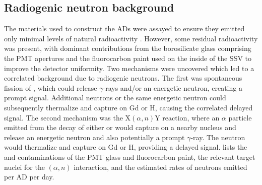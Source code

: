 \subsection{Radiogenic neutron background}
\label{subsec:radn}

The materials used to construct the ADs were
assayed to ensure they emitted only minimal levels of natural radioactivity
\cite{sidebyside}.
However, some residual radioactivity was present,
with dominant contributions from the borosilicate glass comprising the PMT apertures
and the fluorocarbon paint \cite{fluorocarbon_paint} used on the inside of the SSV
to improve the detector uniformity.
Two mechanisms were uncovered which led to a correlated background
due to radiogenic neutrons\cite{rad_n_intro}.
The first was spontaneous fission of ,
which could release $\gamma$-rays and/or an energetic neutron,
creating a prompt signal.
Additional neutrons or the same energetic neutron
could subsequently thermalize and capture on Gd or H,
causing the correlated delayed signal.
The second mechanism was the $\text{X}(\alpha, n)\text{Y}$ reaction,
where an $\alpha$ particle emitted from the decay of
either  or 
would capture on a nearby nucleus
and release an energetic neutron and also potentially a prompt $\gamma$-ray.
The neutron would thermalize and capture on Gd or H, providing a delayed signal.
 lists the  and 
contaminations of the PMT glass and fluorocarbon paint,
the relevant target nuclei for the $(\alpha,n)$ interaction,
and the estimated rates of neutrons emitted per AD per day.



